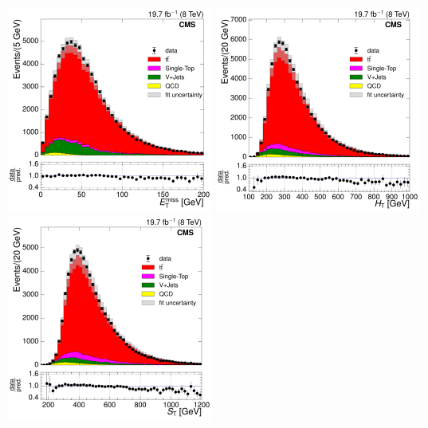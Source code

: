\begin{figure}[hbtp]
    \centering
     \includegraphics[width=0.48\textwidth]{Chapters/04_Analysis/04b_XSections/images/control_plots/after_fit/8TeV/EPlusJets_patType1CorrectedPFMet_2orMoreBtags_with_ratio.pdf}\hfill    
     \includegraphics[width=0.48\textwidth]{Chapters/04_Analysis/04b_XSections/images/control_plots/after_fit/8TeV/EPlusJets_HT_2orMoreBtags_with_ratio.pdf}\\                            
     \includegraphics[width=0.48\textwidth]{Chapters/04_Analysis/04b_XSections/images/control_plots/after_fit/8TeV/EPlusJets_patType1CorrectedPFMet_ST_2orMoreBtags_with_ratio.pdf}\hfill 

\end{figure}
